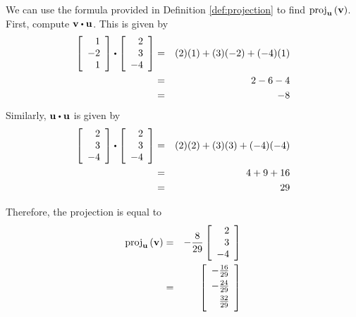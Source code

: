 \begin{solution}
We can use the formula provided in Definition \ref{def:projection} to find $\mbox{proj}_{{\bf u}}\left( {\bf v}\right)$.
First, compute $\vect{v} \dotprod \vect{u}$. 
This is given by 
\begin{eqnarray*}
\leftB
\begin{array}{r}
1 \\
-2 \\
1
\end{array}
\rightB
 \dotprod
\leftB
\begin{array}{r}
2 \\
3 \\
-4
\end{array}
\rightB
&=&
(2)(1) + (3)(-2) + (-4)(1) \\
&=& 
2 - 6 - 4 \\
&=& -8
\end{eqnarray*}
Similarly, $\vect{u} \dotprod \vect{u}$ is given by 
\begin{eqnarray*}
\leftB
\begin{array}{r}
2 \\
3 \\
-4 
\end{array}
\rightB
 \dotprod
\leftB
\begin{array}{r}
2 \\
3 \\
-4
\end{array}
\rightB
&=&
(2)(2) + (3)(3) + (-4)(-4) \\
&=& 
4 + 9 + 16 \\
&=& 29
\end{eqnarray*}

Therefore, the projection is equal to  
\begin{eqnarray*}
\func{proj}_{\vect{u}}\left( \vect{v}\right)
&=&-\frac{8}{29} 
\leftB
\begin{array}{r}
2 \\
3 \\
-4
\end{array}
\rightB \\
&=& 
\leftB
\begin{array}{r}
-\vspace{0.05in}\frac{16}{29} \\
-\vspace{0.05in}\frac{24}{29} \\
\vspace{0.05in}\frac{32}{29}
\end{array}
\rightB
\end{eqnarray*}
\end{solution}

